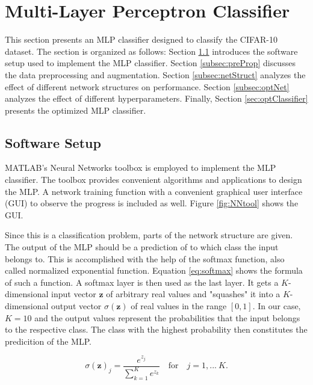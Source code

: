 \section{Multi-Layer Perceptron Classifier}\label{sec:MLP}
	    \pagestyle{mario}

This section presents an MLP classifier designed to classify the CIFAR-10 dataset. The section is organized as follows: Section \ref{subsec:setup} introduces the software setup used to implement the MLP classifier. Section \ref{subsec:preProp} discusses the data preprocessing and augmentation. Section \ref{subsec:netStruct} analyzes the effect of different network structures on performance. Section \ref{subsec:optNet} analyzes the effect of different hyperparameters. Finally, Section \ref{sec:optClassifier} presents the optimized MLP classifier.

\subsection{Software Setup}\label{subsec:setup}

MATLAB's Neural Networks toolbox is employed to implement the MLP classifier. The toolbox provides convenient algorithms and applications to design the MLP. A network training function with a convenient graphical user interface (GUI) to observe the progress is included as well. Figure \ref{fig:NNtool} shows the GUI.

Since this is a classification problem, parts of the network structure are given. The output of the MLP should be a prediction of to which class the input belongs to. This is accomplished with the help of the softmax function, also called normalized exponential function. Equation \ref{eq:softmax} shows the formula of such a function. A softmax layer is then used as the last layer. It gets a $K$-dimensional input vector $\boldsymbol{z}$ of arbitrary real values and "squashes" it into a $K$-dimensional output vector $\sigma(\boldsymbol{z})$ of real values in the range $[0,1]$. In our case, $K=10$ and the output values represent the probabilities that the input belongs to the respective class. The class with the highest probability then constitutes the predicition of the MLP.

\begin{equation}\label{eq:softmax}
\sigma(\boldsymbol{z})_j = \frac{e^{z_j}}{\sum_{k=1}^{K}e^{z_k}}\quad \textrm{for}\quad j = 1,...~K.
\end{equation}

